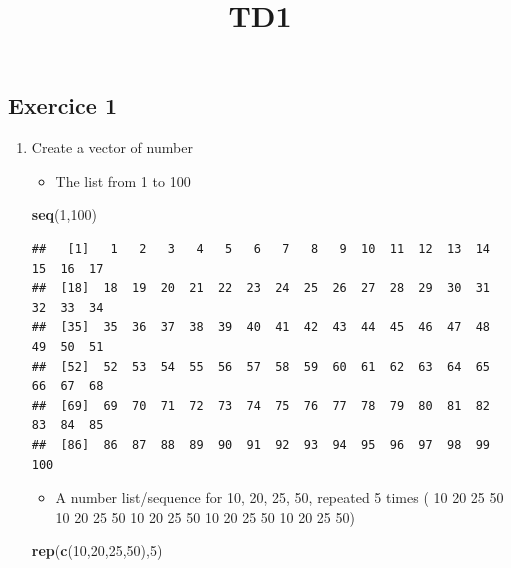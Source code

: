 \documentclass[]{article}
\title{TD1}
\author{}
\date{}
\newenvironment{Shaded}{\begin{snugshade}}{\end{snugshade}}
\newcommand{\KeywordTok}[1]{\textcolor[rgb]{0.13,0.29,0.53}{\textbf{#1}}}
\newcommand{\DecValTok}[1]{\textcolor[rgb]{0.00,0.00,0.81}{#1}}
\newcommand{\NormalTok}[1]{#1}
\providecommand{\tightlist}{%
  \setlength{\itemsep}{0pt}\setlength{\parskip}{0pt}}
\begin{document}
\maketitle

{
\setcounter{tocdepth}{2}
\tableofcontents
}
\subsection{Exercice 1}\label{exercice-1}

\begin{enumerate}
\def\labelenumi{\arabic{enumi}.}
\tightlist
\item
  Create a vector of number

  \begin{itemize}
  \tightlist
  \item
    The list from 1 to 100
  \end{itemize}

\begin{Shaded}
\begin{Highlighting}[]
\KeywordTok{seq}\NormalTok{(}\DecValTok{1}\NormalTok{,}\DecValTok{100}\NormalTok{)}
\end{Highlighting}
\end{Shaded}

\begin{verbatim}
##   [1]   1   2   3   4   5   6   7   8   9  10  11  12  13  14  15  16  17
##  [18]  18  19  20  21  22  23  24  25  26  27  28  29  30  31  32  33  34
##  [35]  35  36  37  38  39  40  41  42  43  44  45  46  47  48  49  50  51
##  [52]  52  53  54  55  56  57  58  59  60  61  62  63  64  65  66  67  68
##  [69]  69  70  71  72  73  74  75  76  77  78  79  80  81  82  83  84  85
##  [86]  86  87  88  89  90  91  92  93  94  95  96  97  98  99 100
\end{verbatim}

  \begin{itemize}
  \tightlist
  \item
    A number list/sequence for 10, 20, 25, 50, repeated 5 times ( 10 20
    25 50 10 20 25 50 10 20 25 50 10 20 25 50 10 20 25 50)
  \end{itemize}

\begin{Shaded}
\begin{Highlighting}[]
\KeywordTok{rep}\NormalTok{(}\KeywordTok{c}\NormalTok{(}\DecValTok{10}\NormalTok{,}\DecValTok{20}\NormalTok{,}\DecValTok{25}\NormalTok{,}\DecValTok{50}\NormalTok{),}\DecValTok{5}\NormalTok{)}
\end{Highlighting}
\end{Shaded}


\end{enumerate}
\end{document}
